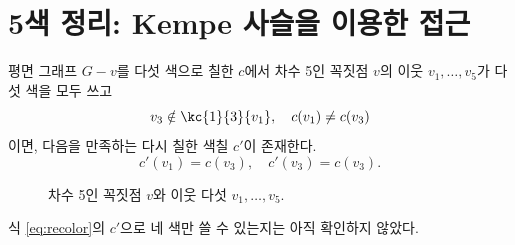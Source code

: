 \section{5색 정리: Kempe 사슬을 이용한 접근}

평면 그래프 $G-v$를 다섯 색으로 칠한 $c$에서 차수 5인 꼭짓점 $v$의 이웃 $v_1,\dots,v_5$가 다섯 색을 모두 쓰고
\begin{equation}\label{eq:kempe}
  v_3 \notin \kc{1}{3}{v_1}, \quad c(v_1) \ne c(v_3)
\end{equation}
이면, 다음을 만족하는 다시 칠한 색칠 $c'$이 존재한다.
\begin{equation}\label{eq:recolor}
  c'(v_1) = c(v_3), \quad c'(v_3) = c(v_3).
\end{equation}

\begin{figure}[h]
  \centering
  \caption{차수 5인 꼭짓점 $v$와 이웃 다섯 $v_1,\dots,v_5$.}
\end{figure}

식 \eqref{eq:recolor}의 $c'$으로 네 색만 쓸 수 있는지는 아직 확인하지 않았다.
